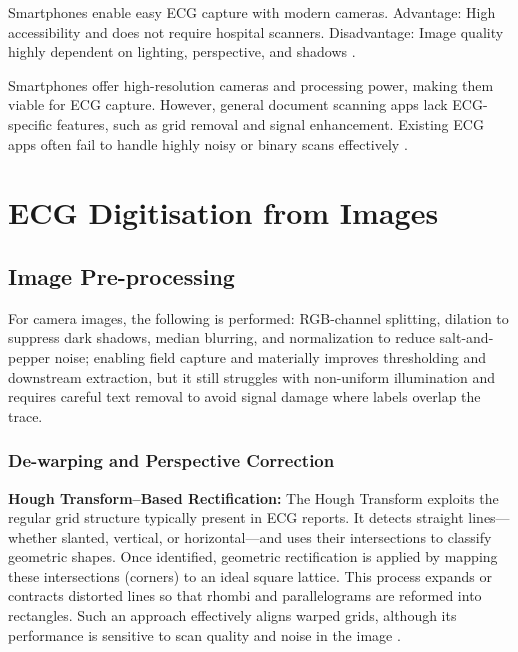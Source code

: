 Smartphones enable easy ECG capture with modern cameras. Advantage: High accessibility and does not require hospital scanners. Disadvantage: Image quality highly dependent on lighting, perspective, and shadows \cite{Mishra2021}.

Smartphones offer high-resolution cameras and processing power, making them viable for ECG capture. However, general document scanning apps lack ECG-specific features, such as grid removal and signal enhancement. Existing ECG apps often fail to handle highly noisy or binary scans effectively \cite{LI2020104077}.


\section{ECG Digitisation from Images}

\subsection{Image Pre-processing}

For camera images, the following is performed: RGB-channel splitting, dilation to suppress dark shadows, median blurring, and normalization to reduce salt-and-pepper noise; enabling field capture and materially improves thresholding and downstream extraction, but it still struggles with non-uniform illumination and requires careful text removal to avoid signal damage where labels overlap the trace. \cite{Mishra2021}

\subsubsection{De-warping and Perspective Correction}

\textbf{Hough Transform–Based Rectification:} The Hough Transform exploits the regular grid structure typically present in ECG reports. It detects straight lines—whether slanted, vertical, or horizontal—and uses their intersections to classify geometric shapes. Once identified, geometric rectification is applied by mapping these intersections (corners) to an ideal square lattice. This process expands or contracts distorted lines so that rhombi and parallelograms are reformed into rectangles. Such an approach effectively aligns warped grids, although its performance is sensitive to scan quality and noise in the image \cite{LI2020104077}.

